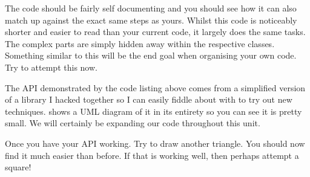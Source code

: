 \documentclass[10pt]{article}
\begin{document}
The code should be fairly self documenting and you should see how it
can also match up against the exact same steps as yours. Whilst this
code is noticeably shorter and easier to read than your current code,
it largely does the same tasks. The complex parts are simply hidden
away within the respective classes. Something similar to this will be
the end goal when organising your own code. Try to attempt this now.


The API demonstrated by the code listing above comes from a simplified
version of a library I hacked together so I can easily fiddle about with
 to try out new techniques.  shows a UML diagram of
it in its entirety so you can see it is pretty small. We will certainly
be expanding our code throughout this unit.





Once you have your API working. Try to draw another triangle. You should now find it much easier than before.
If that is working well, then perhaps attempt a square!
\end{document}
